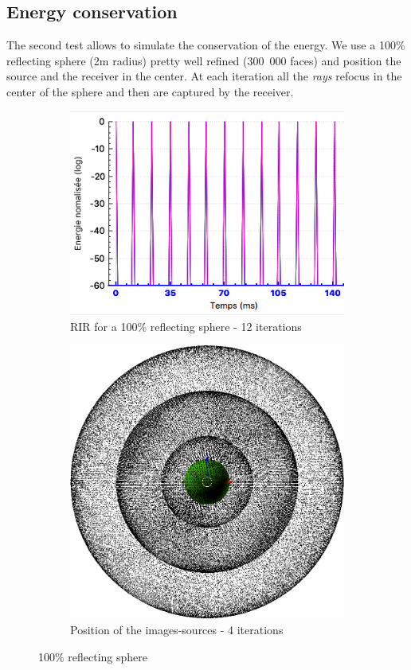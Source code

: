 \documentclass[AMA,STIX1COL]{WileyNJD-v2}
\begin{document}
\subsection {Energy conservation}
The second test allows to simulate the conservation of the energy. We use a 100\% reflecting sphere (2m radius) pretty well refined (300~000 faces) and position the source and the receiver in the center. At each iteration all the \textit{rays} refocus in the center of the sphere and then are captured by the receiver.
\begin{figure}[h]
\centering
	\begin{subfigure}{0.45\textwidth}
		\includegraphics[width=\linewidth]{test2RIR}
		\caption{RIR for a 100\% reflecting sphere - 12 iterations}
		\label{test2RIR}
	\end{subfigure}
	\quad
	\begin{subfigure}{0.38\textwidth}
		\includegraphics[width=\linewidth]{test2SI}
		\caption{Position of the images-sources - 4 iterations}
		\label{test2SI}
	\end{subfigure}
	\caption{100\% reflecting sphere}
\end{figure}
\end{document}
